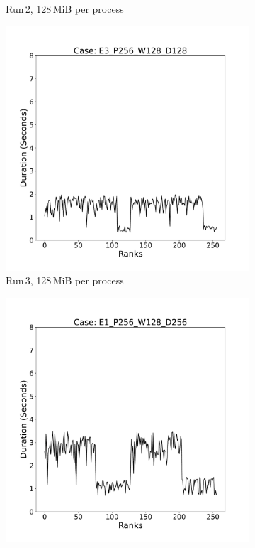 \begin{figure}
\begin{subfigure}[b]{0.3\textwidth}
         \caption{Run\,2, 128\,MiB per process}
         \label{fig:E2_128}
     \end{subfigure}
      \hfill
     \begin{subfigure}[b]{0.3\textwidth}
         \centering
         \includegraphics[width=\textwidth, height=\textwidth]{figures/E3_P256_W128_D128.pdf}
         \caption{Run\,3, 128\,MiB per process}
         \label{fig:E3_128}
     \end{subfigure}
     \vfill
     \begin{subfigure}[b]{0.3\textwidth}
         \centering
         \includegraphics[width=\textwidth, height=\textwidth]{figures/E1_P256_W128_D256.pdf}

\end{subfigure}
\end{figure}
